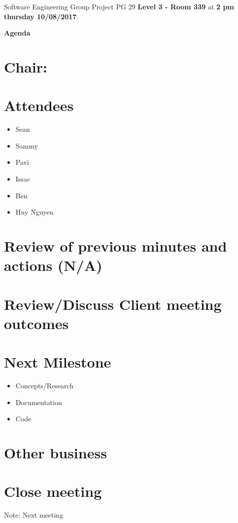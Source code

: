 \documentclass[11pt, a4paper]{article}
\begin{document}
	\noindent Software Engineering Group Project PG 29 {\bf Level 3 - Room 339} at {\bf 2 pm thursday 10/08/2017}.
	\vspace*{10pt}
	\begin{center}
		\huge \bf Agenda
	\end{center}
	
	\section*{Chair: }
	
	\vspace*{10pt}
	
	\section{Attendees}
	\begin{itemize}
		\item Sean
		\item Sammy
		\item Pavi
		\item Issac
		\item Ben
		\item Huy Nguyen
	\end{itemize}
	
	\section{Review of previous minutes and actions (N/A)}
	
	\section{Review/Discuss Client meeting outcomes}
	
	\section{Next Milestone}
	\begin{itemize}
		\item Concepts/Research
		\item Documentation
		\item Code
	\end{itemize}
	
	\section{Other business}
	
	\section {Close meeting}
	\vspace*{10pt}
	\noindent Note: Next meeting 
	
\end{document}
